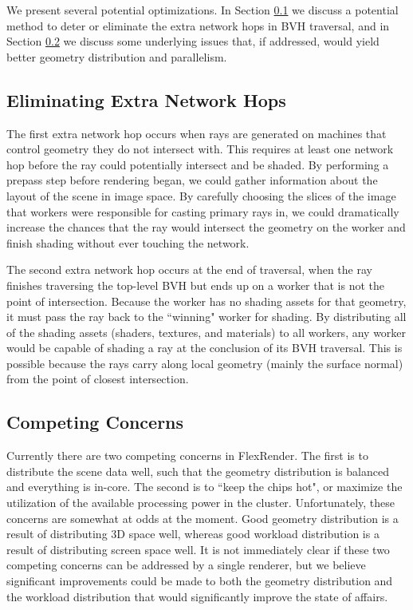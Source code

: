 \documentclass[12pt]{ucthesis}
\begin{document}
We present several potential optimizations. In Section \ref{networkhop} we
discuss a potential method to deter or eliminate the extra network hops in BVH
traversal, and in Section \ref{concerns} we discuss some underlying issues that,
if addressed, would yield better geometry distribution and parallelism.

\subsection{Eliminating Extra Network Hops}
\label{networkhop}

The first extra network hop occurs when rays are generated on machines that
control geometry they do not intersect with. This requires at least one
network hop before the ray could potentially intersect and be shaded. By performing
a prepass step before rendering began, we could gather information about the
layout of the scene in image space. By carefully choosing the slices of the
image that workers were responsible for casting primary rays in, we could
dramatically increase the chances that the ray would intersect the geometry
on the worker and finish shading without ever touching the network.

The second extra network hop occurs at the end of traversal, when the ray finishes
traversing the top-level BVH but ends up on a worker that is not the point of
intersection. Because the worker has no shading assets for that geometry, it
must pass the ray back to the ``winning" worker for shading. By distributing
all of the shading assets (shaders, textures, and materials) to all workers,
any worker would be capable of shading a ray at the conclusion of its BVH traversal.
This is possible because the rays carry along local geometry (mainly the surface
normal) from the point of closest intersection.

\subsection{Competing Concerns}
\label{concerns}

Currently there are two competing concerns in FlexRender. The first is to
distribute the scene data well, such that the geometry distribution is balanced
and everything is in-core. The second is to ``keep the chips hot", or maximize
the utilization of the available processing power in the cluster. Unfortunately,
these concerns are somewhat at odds at the moment. Good geometry distribution
is a result of distributing 3D space well, whereas good workload distribution
is a result of distributing screen space well. It is not immediately clear if
these two competing concerns can be addressed by a single renderer, but we
believe significant improvements could be made to both the geometry distribution
and the workload distribution that would significantly improve the state of affairs.
\end{document}
